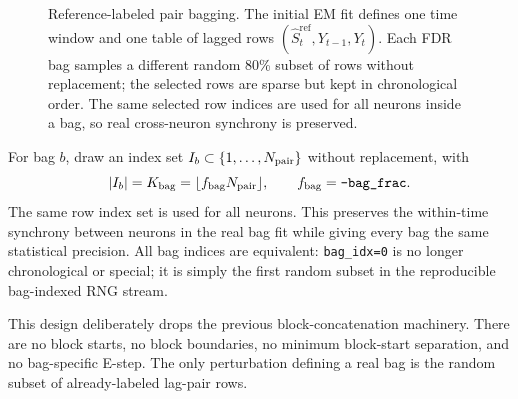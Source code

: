 \documentclass[11pt]{article}
\begin{document}
\begin{figure}[h]
\caption{Reference-labeled pair bagging. The initial EM fit defines one
time window and one table of lagged rows \((\hat S^{\text{ref}}_t,Y_{t-1},Y_t)\).
Each FDR bag samples a different random 80\% subset of rows without
replacement; the selected rows are sparse but kept in chronological order.
The same selected row indices are used for all neurons inside a bag, so
real cross-neuron synchrony is preserved.}
\label{fig:bagging-cartoon}
\end{figure}

For bag \(b\), draw an index set \(I_b\subset\{1,\dots,N_{\rm pair}\}\)
without replacement, with
\[
|I_b|=K_{\rm bag}=\lfloor f_{\rm bag}N_{\rm pair}\rfloor,
\qquad f_{\rm bag}=\texttt{--bag\_frac}.
\]
The same row index set is used for all neurons. This preserves the
within-time synchrony between neurons in the real bag fit while giving every
bag the same statistical precision. All bag indices are equivalent:
\texttt{bag\_idx=0} is no longer chronological or special; it is simply the
first random subset in the reproducible bag-indexed RNG stream.

This design deliberately drops the previous block-concatenation machinery.
There are no block starts, no block boundaries, no minimum block-start
separation, and no bag-specific E-step. The only perturbation defining a
real bag is the random subset of already-labeled lag-pair rows.
\end{document}
